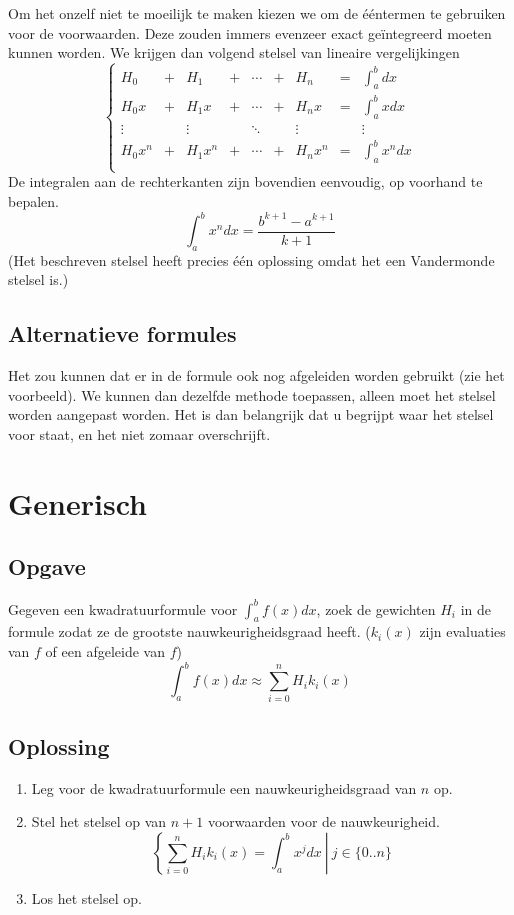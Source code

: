\documentclass[12pt,a4paper]{article}
\begin{document}
Om het onzelf niet te moeilijk te maken kiezen we om de \'e\'entermen te gebruiken voor de voorwaarden. Deze zouden immers evenzeer exact ge\"integreerd moeten kunnen worden. We krijgen dan volgend stelsel van lineaire vergelijkingen
\[
\left\{
\begin{array}{ccccccccc}
H_0 &+& H_1 &+& \cdots &+& H_n &=& \int_{a}^{b}dx\\
H_0x &+& H_1x &+& \cdots &+& H_nx &=& \int_{a}^{b}xdx\\
\vdots && \vdots && \ddots && \vdots && \vdots\\
H_0x^n &+& H_1x^n &+& \cdots &+& H_nx^n &=& \int_{a}^{b}x^ndx\\
\end{array}
\right.
\]
De integralen aan de rechterkanten zijn bovendien eenvoudig, op voorhand te bepalen.
\[
\int_{a}^{b}x^ndx = \frac{b^{k+1}-a^{k+1}}{k+1}
\]
(Het beschreven stelsel heeft precies \'e\'en oplossing omdat het een Vandermonde stelsel is.)

\subsection{Alternatieve formules}
Het zou kunnen dat er in de formule ook nog afgeleiden worden gebruikt (zie het voorbeeld). We kunnen dan dezelfde methode toepassen, alleen moet het stelsel worden aangepast worden.
Het is dan belangrijk dat u begrijpt waar het stelsel voor staat, en het niet zomaar overschrijft.

\section{Generisch}
\subsection{Opgave}
Gegeven een kwadratuurformule voor $\int_{a}^{b}f(x)dx$, zoek de gewichten $H_i$ in de formule zodat ze de grootste nauwkeurigheidsgraad heeft. ($k_i(x)$ zijn evaluaties van $f$ of een afgeleide van $f$)
\[
\int_{a}^{b}f(x)dx \approx \sum_{i=0}^{n}H_ik_i(x)
\]

\subsection{Oplossing}
\begin{enumerate}
\item Leg voor de kwadratuurformule een nauwkeurigheidsgraad van $n$ op.
\item Stel het stelsel op van $n+1$ voorwaarden voor de nauwkeurigheid.
\[
\left\{
\sum_{i=0}^{n}H_ik_i(x) = \int_{a}^{b}x^jdx\ \right|\ j \in \{0..n\}
\]
\item Los het stelsel op.
\end{enumerate}
\end{document}
